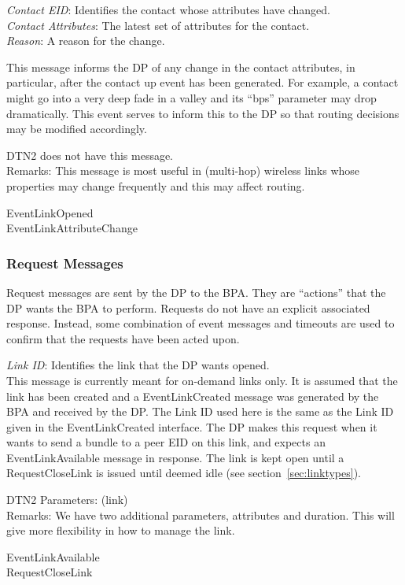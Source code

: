 {
\metP
    {\em Contact EID}: Identifies the contact whose attributes have changed.\\
    {\em Contact Attributes}: The latest set of attributes for the contact.\\
    {\em Reason}: A reason for the change.

\metD
    This message informs the DP of any change in the contact attributes,
    in particular, after the contact up event has been generated. For
    example, a contact might go into a very deep fade in a valley and its
    ``bps'' parameter may drop dramatically. This event serves to inform this
    to the DP so that routing decisions may be modified accordingly.

\metM
    DTN2 does not have this message.\\
    Remarks: This message is most useful in (multi-hop) wireless links
    whose properties may change frequently and this may affect routing.

\metR
    EventLinkOpened\\
    EventLinkAttributeChange
}


\subsubsection{Request Messages}
\label{sec:DP-RequestMessages}

Request messages are sent by the DP to the BPA. They are ``actions''
that the DP wants the BPA to perform. Requests do not have an explicit
associated response. Instead, some combination of event messages and
timeouts are used to confirm that the requests have been acted
upon.\\[1em]

{
\metP
    {\em Link ID}: Identifies the link that the DP wants opened.\\

\metD
    This message is currently meant for on-demand links only. It is
    assumed that the link has been created and a EventLinkCreated
    message was generated by the BPA and received by the DP. The Link
    ID used here is the same as the Link ID given in the
    EventLinkCreated interface.  The DP makes this request when it
    wants to send a bundle to a peer EID on this link, and expects an
    EventLinkAvailable message in response.  The link is kept open
    until a RequestCloseLink is issued until deemed idle (see
    section~\ref{sec:linktypes}).

\metM
    DTN2 Parameters: (link)\\
    Remarks: We have two additional parameters, attributes and duration. 
    This will give more flexibility in how to manage the link. 

\metR
    EventLinkAvailable\\
    RequestCloseLink
}

